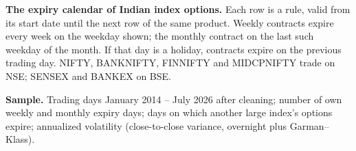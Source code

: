 \begin{table}[t]
\centering
\caption{\textbf{The expiry calendar of Indian index options.} Each row is a rule, valid from its start date until the next row of the same product. Weekly contracts expire every week on the weekday shown; the monthly contract on the last such weekday of the month. If that day is a holiday, contracts expire on the previous trading day. NIFTY, BANKNIFTY, FINNIFTY and MIDCPNIFTY trade on NSE; SENSEX and BANKEX on BSE.}
\label{tab:rules}
\scriptsize
{}
\end{table}

\begin{table}[t]
\centering
\caption{\textbf{Sample.} Trading days January 2014 -- July 2026 after cleaning; number of own weekly and monthly expiry days; days on which another large index's options expire; annualized volatility (close-to-close variance, overnight plus Garman--Klass).}
\label{tab:sample}
\small
{}
\end{table}
